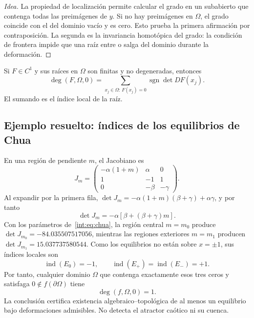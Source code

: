 \begin{proof}[Idea]
La propiedad de localización permite calcular el grado en un subabierto que
contenga todas las preimágenes de \(y\). Si no hay preimágenes en
\(\Omega\), el grado coincide con el del dominio vacío y es cero. Esto
prueba la primera afirmación por contraposición. La segunda es la invariancia
homotópica del grado: la condición de frontera impide que una raíz entre o
salga del dominio durante la deformación.
\end{proof}

Si \(F\in C^1\) y sus raíces en \(\Omega\) son finitas y no degeneradas,
entonces
\begin{equation}
 \deg(F,\Omega,0)=
 \sum_{x_j\in\Omega:\,F(x_j)=0}\operatorname{sgn}\det DF(x_j).
 \label{geo:eq:degree-sum}
\end{equation}
El sumando es el índice local de la raíz.



\subsection{Ejemplo resuelto: índices de los equilibrios de Chua}

En una región de pendiente \(m\), el Jacobiano es
\[
 J_m=\begin{pmatrix}
 -\alpha(1+m)&\alpha&0\\
 1&-1&1\\
 0&-\beta&-\gamma
 \end{pmatrix}.
\]
Al expandir por la primera fila,
\(\det J_m=-\alpha(1+m)(\beta+\gamma)+\alpha\gamma\), y por tanto
\begin{equation}
 \det J_m=-\alpha[\beta+(\beta+\gamma)m].
 \label{geo:eq:chua-index-det}
\end{equation}
Con los parámetros de~\eqref{int:eq:chua}, la región central \(m=m_0\)
produce \(\det J_{m_0}=-84.035507517056\), mientras las regiones exteriores
\(m=m_1\) producen \(\det J_{m_1}=15.037737580544\). Como los equilibrios no
están sobre \(x=\pm1\), sus índices locales son
\begin{equation}
 \operatorname{ind}(E_0)=-1,\qquad
 \operatorname{ind}(E_+)=\operatorname{ind}(E_-)=+1.
 \label{geo:eq:chua-equilibrium-indices}
\end{equation}
Por tanto, cualquier dominio \(\Omega\) que contenga exactamente esos tres
ceros y satisfaga \(0\notin f(\partial\Omega)\) tiene
\begin{equation}
 \deg(f,\Omega,0)=1.
 \label{geo:eq:chua-degree}
\end{equation}
La conclusión certifica existencia algebraico--topológica de al menos un
equilibrio bajo deformaciones admisibles. No detecta el atractor caótico ni
su cuenca.

